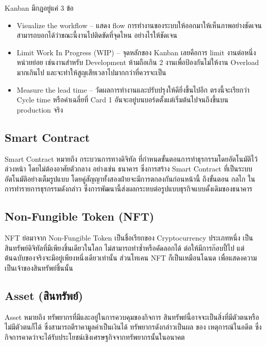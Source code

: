 \documentclass[12pt,oneside,openright,a4paper]{cpe-thai-project}
\begin{document}
\begin{enumerate}[label=\thesubsection.\arabic*,leftmargin=0pt,itemindent=2.5cm]
\begin{itemize}[leftmargin=0pt,itemindent=2.5cm]
Kanban มีกฎอยู่แค่ 3 ข้อ 
	\begin{itemize}[leftmargin=0pt,itemindent=3cm]
		\item Visualize the workflow – แสดง flow การทำงานของระบบให้ออกมาให้เห็นภาพอย่างชัดเจน สามารถบอกได้ว่าขณะนี้งานไปติดขัดที่จุดไหน 			อย่างไรให้ชัดเจน
		\item Limit Work In Progress (WIP) – จุดหลักของ Kanban เลยคือการ limit งานต่อหนึ่งหน่วยย่อย เช่นงานสำหรับ Development ห้ามถือเกิน	 			2 งานเพื่อป้องกันไม่ให้งาน Overload มากเกินไป และจะทำให้สูญเสียเวลาไปมากกว่าที่ควรจะเป็น
		\item Measure the lead time – วัดผลการทำงานและปรับปรุงให้ดียิ่งขึ้นไปอีก ตรงนี้จะเรียกว่า Cycle time หรือค่าเฉลี่ยที่ Card 1 							อันจะอยู่บนบอร์ดตั้งแต่เริ่มต้นไปจนถึงขึ้นบน production จริง
		\end{itemize}
	\end{itemize}
\end{enumerate}

\subsection{Smart Contract \cite{smartcontract}}
\tab Smart Contract หมายถึง กระบวนการทางดิจิทัล ที่กำหนดขั้นตอนการทำธุรกรรมโดยอัตโนมัติไว้ล่วงหน้า โดยไม่ต้องอาศัยตัวกลาง อย่างเช่น ธนาคาร ซึ่งการสร้าง Smart Contract ที่เป็นระบบอัตโนมัติอย่างเต็มรูปแบบ โดยคู่สัญญาทั้งสองฝ่ายจะมีการตกลงกันก่อนหน้านี้ ถึงขั้นตอน กลไก ในการทำรายการธุรกรรมดังกล่าว ซึ่งการพัฒนานี้ส่งผลกระทบต่อรูปแบบธุรกิจแบบดั้งเดิมของธนาคาร

\subsection{Non-Fungible Token (NFT) \cite{nft}}
\tab NFT ย่อมาจาก Non-Fungible Token เป็นชื่อเรียกของ Cryptocurrency ประเภทหนึ่ง เป็นสินทรัพย์ดิจิทัลที่มีเพียงชิ้นเดียวในโลก ไม่สามารถทำซ้ำหรือคัดลอกได้ ต่อให้มีการก๊อบปี้ไป แต่ต้นฉบับของจริงจะมีอยู่เพียงหนึ่งเดียวเท่านั้น ส่วนโทเคน NFT ก็เป็นเหมือนโฉนด เพื่อแสดงความเป็นเจ้าของสินทรัพย์ชิ้นนั้น

\subsection{Asset (สินทรัพย์)  \cite{asset}}
\tab Asset หมายถึง ทรัพยากรที่มีและอยู่ในการควบคุมของกิจการ สินทรัพย์นี้อาจจะเป็นสิ่งที่มีตัวตนหรือไม่มีตัวตนก็ได้ ซึ่งสามารถตีราคามูลค่าเป็นเงินได้ ทรัพยากรดังกล่าวเป็นผล ของ เหตุการณ์ในอดีต ซึ่งกิจการคาดว่าจะได้รับประโยชน์เชิงเศรษฐกิจจากทรัพยากรนั้นในอนาคต
\end{document}
